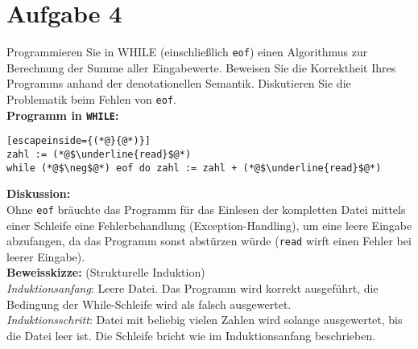 \documentclass[ngerman,a4paper]{report}
\begin{document}
\section*{Aufgabe 4}
Programmieren Sie in WHILE (einschließlich \lstinline!eof!) einen Algorithmus zur Berechnung der Summe aller Eingabewerte. Beweisen Sie die Korrektheit Ihres Programms anhand der denotationellen Semantik. Diskutieren Sie die Problematik beim Fehlen von \lstinline!eof!.\\
\textbf{Programm in \texttt{WHILE}:}\\
\begin{lstlisting}[escapeinside={(*@}{@*)}]
zahl := (*@$\underline{read}$@*)
while (*@$\neg$@*) eof do zahl := zahl + (*@$\underline{read}$@*)
\end{lstlisting}

\textbf{Diskussion:}\\
Ohne \lstinline$eof$ bräuchte das Programm für das Einlesen der kompletten Datei mittels einer Schleife eine Fehlerbehandlung (Exception-Handling), um eine leere Eingabe abzufangen, da das Programm sonst abstürzen würde (\lstinline$read$ wirft einen Fehler bei leerer Eingabe).\\

\textbf{Beweisskizze:} (Strukturelle Induktion)\\
\emph{Induktionsanfang}: Leere Datei. Das Programm wird korrekt ausgeführt, die Bedingung der While-Schleife wird als falsch ausgewertet.\\
\emph{Induktionsschritt}: Datei mit beliebig vielen Zahlen wird solange ausgewertet, bis die Datei leer ist. Die Schleife bricht wie im Induktionsanfang beschrieben.\\
\end{document}
